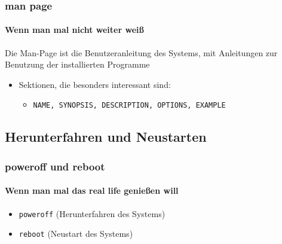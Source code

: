 \documentclass[12pt,utf8]{beamer}
\begin{document}
\begin{frame}
	\frametitle{man page}
	\framesubtitle{Wenn man mal nicht weiter weiß}
	Die Man-Page ist die Benutzeranleitung des Systems, mit Anleitungen zur Benutzung der installierten Programme
	\begin{itemize}
		\item Sektionen, die besonders interessant sind:
		\begin{itemize}
			\item {\scriptsize \texttt{NAME, SYNOPSIS, DESCRIPTION, OPTIONS, EXAMPLE}}
		\end{itemize}
	\end{itemize}
\end{frame}


\subsection{Herunterfahren und Neustarten}
\begin{frame}
\frametitle{poweroff und reboot}
\framesubtitle{Wenn man mal das real life genießen will}
\begin{itemize}
	\item \texttt{poweroff} (Herunterfahren des Systems)
	\item \texttt{reboot} (Neustart des Systems)
\end{itemize}
\end{frame}
\end{document}
